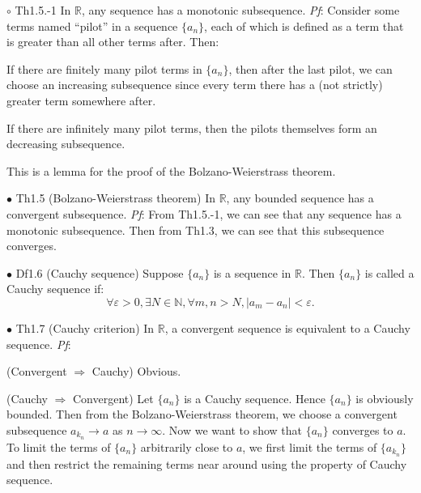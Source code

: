 \documentclass{article}
\begin{document}
\begin{Th}{$\circ$ Th1.5.-1}
    In $\mathbb{R}$, any sequence has a monotonic subsequence.
    \tcblower
    \textit{Pf}: Consider some terms named ``pilot'' in a sequence $\{a_n\}$, each of which is defined as a term that is greater than all other terms after. Then:
    \begin{compactitem}
        \item If there are finitely many pilot terms in $\{a_n\}$, then after the last pilot, we can choose an increasing subsequence since every term there has a (not strictly) greater term somewhere after.
        \item If there are infinitely many pilot terms, then the pilots themselves form an decreasing subsequence.
    \end{compactitem}
\end{Th}

\begin{Rmk}{}
    This is a lemma for the proof of the Bolzano-Weierstrass theorem.
\end{Rmk}

\begin{Th}{$\bullet$ Th1.5 (Bolzano-Weierstrass theorem)}
    In $\mathbb{R}$, any bounded sequence has a convergent subsequence.
    \tcblower
    \textit{Pf}: From Th1.5.-1, we can see that any sequence has a monotonic subsequence. Then from Th1.3, we can see that this subsequence converges.
\end{Th}

\begin{Df}{$\bullet$ Df1.6 (Cauchy sequence)}
    Suppose $\{a_n\}$ is a sequence in $\mathbb{R}$. Then $\{a_n\}$ is called a Cauchy sequence if:
    $$\forall \varepsilon>0, \exists N\in\mathbb{N}, \forall m, n > N, |a_m-a_n|<\varepsilon.$$
\end{Df}

\begin{Th}{$\bullet$ Th1.7 (Cauchy criterion)}
    In $\mathbb{R}$, a convergent sequence is equivalent to a Cauchy sequence.
    \tcblower
    \textit{Pf}: 
    \begin{compactenum}
        \item (Convergent $\Rightarrow$ Cauchy) Obvious.
        \item (Cauchy $\Rightarrow$ Convergent) Let $\{a_n\}$ is a Cauchy sequence. Hence $\{a_n\}$ is obviously bounded. Then from the Bolzano-Weierstrass theorem, we choose a convergent subsequence $a_{k_n} \rightarrow a$ as $n\to \infty$. Now we want to show that $\{a_n\}$ converges to $a$. To limit the terms of $\{a_n\}$ arbitrarily close to $a$, we first limit the terms of $\{a_{k_n}\}$ and then restrict the remaining terms near around using the property of Cauchy sequence.
    \end{compactenum}
\end{Th}
\end{document}
